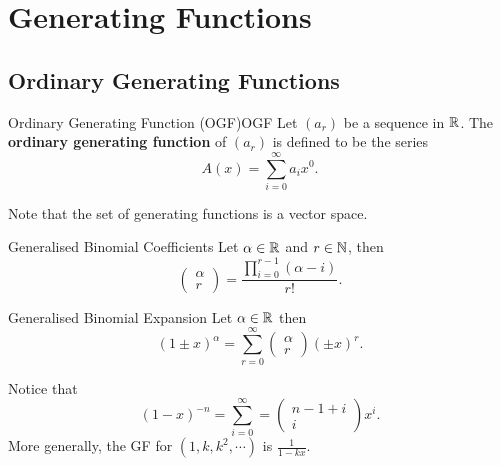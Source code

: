\documentclass[math]{amznotes}
\theoremstyle{remark}
\begin{document}

\chapter{Generating Functions}
\section{Ordinary Generating Functions}
\begin{dfnbox}{Ordinary Generating Function (OGF)}{OGF}
    Let $(a_r)$ be a sequence in $\mathbb{R}$. The {\color{red} \textbf{ordinary generating function}} of $(a_r)$ is defined to be the series
    \begin{equation*}
        A(x) = \sum_{i = 0}^{\infty}a_ix^0.
    \end{equation*}
\end{dfnbox}
Note that the set of generating functions is a vector space.
\begin{dfnbox}{Generalised Binomial Coefficients}{}
    Let $\alpha \in \mathbb{R}$ and $r \in \mathbb{N}$, then 
    \begin{equation*}
        \begin{pmatrix}
            \alpha \\
            r
        \end{pmatrix} = \frac{\prod_{i = 0}^{r - 1}(\alpha - i)}{r!}.
    \end{equation*}
\end{dfnbox}

\begin{dfnbox}{Generalised Binomial Expansion}{}
    Let $\alpha \in \mathbb{R}$ then 
    \begin{equation*}
        (1 \pm x)^\alpha = \sum_{r = 0}^{\infty}\begin{pmatrix}
            \alpha \\
            r
        \end{pmatrix}(\pm x)^r.
    \end{equation*}
\end{dfnbox}
Notice that
\begin{equation*}
    (1 - x)^{-n} = \sum_{i = 0}^{\infty} = \begin{pmatrix}
        n - 1 + i \\
        i
    \end{pmatrix}x^i.
\end{equation*}
More generally, the GF for $\left(1, k, k^2, \cdots\right)$ is $\frac{1}{1 - kx}$.
\end{document}
